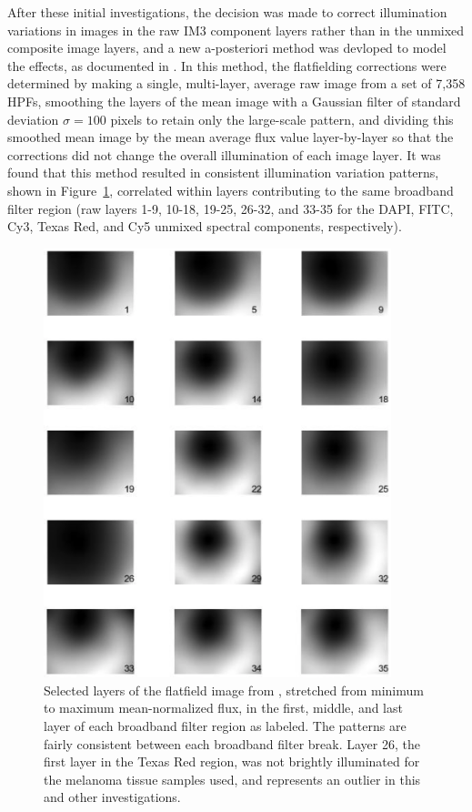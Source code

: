 \documentclass[letterpaper,11pt]{article}
\newcommand{\reffig}[1]{Figure~\ref{#1}}
\begin{document}
After these initial investigations, the decision was made to correct illumination variations in images in the raw IM3 component layers rather than in the unmixed composite image layers, and a new a-posteriori method was devloped to model the effects, as documented in \cite{Alex_flatfielding_2}. In this method, the flatfielding corrections were determined by making a single, multi-layer, average raw image from a set of 7,358 HPFs, smoothing the layers of the mean image with a Gaussian filter of standard deviation $\sigma=100$ pixels to retain only the large-scale pattern, and dividing this smoothed mean image by the mean average flux value layer-by-layer so that the corrections did not change the overall illumination of each image layer. It was found that this method resulted in consistent illumination variation patterns, shown in \reffig{fig:second_flatfielding}, correlated within layers contributing to the same broadband filter region (raw layers 1-9, 10-18, 19-25, 26-32, and 33-35 for the DAPI, FITC, Cy3, Texas Red, and Cy5 unmixed spectral components, respectively).

\begin{figure}[!ht]
\centering
\includegraphics[width=0.9\textwidth]{images/introduction/second_flatfield_image_layers}
\caption{\footnotesize Selected layers of the flatfield image from \cite{Alex_flatfielding_2}, stretched from minimum to maximum mean-normalized flux, in the first, middle, and last layer of each broadband filter region as labeled. The patterns are fairly consistent between each broadband filter break. Layer 26, the first layer in the Texas Red region, was not brightly illuminated for the melanoma tissue samples used, and represents an outlier in this and other investigations.}
\label{fig:second_flatfielding}
\end{figure}
\end{document}
